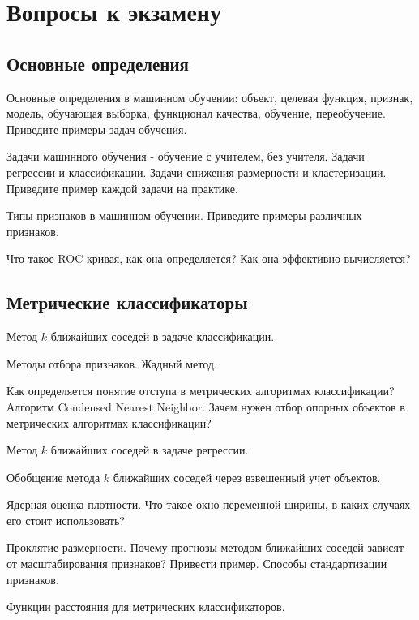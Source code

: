 \documentclass[a4paper,12pt]{article}
\begin{document}
  \section*{Вопросы к экзамену}
  
  \subsection*{Основные определения}  
  
  \myparagraph Основные определения в машинном обучении: объект, целевая функция, признак, модель, обучающая выборка, функционал качества, обучение, переобучение. Приведите примеры задач обучения. 

  \myparagraph Задачи машинного обучения - обучение с учителем, без учителя. Задачи регрессии и классификации. Задачи снижения размерности и кластеризации. Приведите пример каждой задачи на практике.

  \myparagraph Типы признаков в машинном обучении. Приведите примеры различных признаков.
  
  \myparagraph Что такое ROC-кривая, как она определяется? Как она эффективно вычисляется?
  
  \subsection*{Метрические классификаторы}  
  
  \myparagraph Метод $k$ ближайших соседей в задаче классификации. 

  \myparagraph Методы отбора признаков. Жадный метод.  

  \myparagraph Как определяется понятие отступа в метрических алгоритмах классификации? Алгоритм Condensed Nearest Neighbor. Зачем нужен отбор опорных объектов в метрических алгоритмах классификации?
  
  \myparagraph Метод $k$ ближайших соседей в задаче регрессии.
  
  \myparagraph Обобщение метода $k$ ближайших соседей через взвешенный учет объектов. 
  
  \myparagraph Ядерная оценка плотности. Что такое окно переменной ширины, в каких случаях его стоит использовать?
  
  \myparagraph Проклятие размерности. Почему прогнозы методом ближайших соседей зависят от масштабирования признаков? Привести пример. Способы стандартизации признаков.
  
  \myparagraph Функции расстояния для метрических классификаторов.  
  
\end{document}
